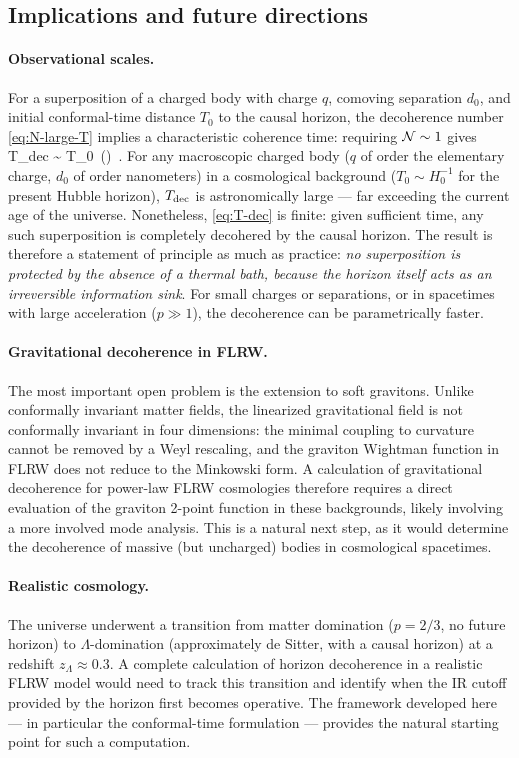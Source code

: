 \subsection{Implications and future directions}
\label{sec:discussion-future}

\paragraph{Observational scales.}
For a superposition of a charged body with charge $q$, comoving separation $d_0$,
and initial conformal-time distance $T_0$ to the causal horizon, the decoherence
number \cref{eq:N-large-T} implies a characteristic coherence time: requiring
$\mathcal{N} \sim 1$ gives
%
\be
  T_{\rm dec}
  \;\sim\;
  T_0\, \exp\!\lb(\rb) \,.
  \label{eq:T-dec}
\ee
%
For any macroscopic charged body ($q$ of order the elementary charge, $d_0$ of
order nanometers) in a cosmological background ($T_0 \sim H_0^{-1}$ for the
present Hubble horizon), $T_{\rm dec}$ is astronomically large — far exceeding
the current age of the universe.  Nonetheless, \cref{eq:T-dec} is finite: given
sufficient time, any such superposition is completely decohered by the causal
horizon.  The result is therefore a statement of principle as much as practice:
\emph{no superposition is protected by the absence of a thermal bath, because the
horizon itself acts as an irreversible information sink}.  For small charges or
separations, or in spacetimes with large acceleration ($p \gg 1$), the
decoherence can be parametrically faster.

\paragraph{Gravitational decoherence in FLRW.}
The most important open problem is the extension to soft gravitons.  Unlike
conformally invariant matter fields, the linearized gravitational field is not
conformally invariant in four dimensions: the minimal coupling to curvature
cannot be removed by a Weyl rescaling, and the graviton Wightman function in
FLRW does not reduce to the Minkowski form.  A calculation of gravitational
decoherence for power-law FLRW cosmologies therefore requires a direct
evaluation of the graviton 2-point function in these backgrounds, likely
involving a more involved mode analysis.  This is a natural next step, as it
would determine the decoherence of massive (but uncharged) bodies in
cosmological spacetimes.

\paragraph{Realistic cosmology.}
The universe underwent a transition from matter domination ($p = 2/3$, no future
horizon) to $\Lambda$-domination (approximately de Sitter, with a causal horizon)
at a redshift $z_\Lambda \approx 0.3$.  A complete calculation of horizon
decoherence in a realistic FLRW model would need to track this transition and
identify when the IR cutoff provided by the horizon first becomes operative.  The
framework developed here — in particular the conformal-time formulation — provides
the natural starting point for such a computation.


